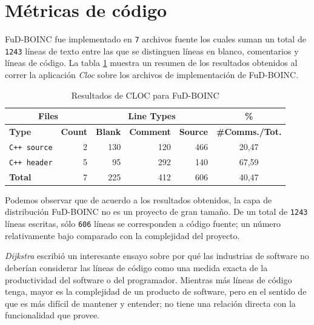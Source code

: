 \newpage
\section{Métricas de código}

FuD-BOINC fue implementado en \texttt{7} archivos fuente los cuales suman un total de \texttt{1243} líneas de texto entre las que se distinguen líneas en blanco, comentarios y líneas de código. La tabla \ref{metrics:cloc} muestra un resumen de los resultados obtenidos al correr la aplicación \textit{Cloc} sobre los archivos de implementación de FuD-BOINC.

\begin{table}[!htf]
    \begin{center}
    \begin{tabular}{|l|r|r|r|r|c|}
    \hline
    \multicolumn{2}{|c|}{Files} & \multicolumn{3}{|c|}{Line Types} & \hspace{0.2cm}\% \\
    \hline
    \textbf{Type} & \textbf{Count} & \textbf{Blank} & \textbf{Comment} & \textbf{Source} & \small{\textbf{\#Comms./Tot.}}\\
    \hline
    \texttt{C++ source} & 2 &  130  &  120  &   466  &   20,47\\
    \hline
    \texttt{C++ header} & 5 &   95  &  292  &   140  &   67,59 \\
    \hline
    \textbf{Total} &    7   &  225  &  412  &   606  &   40,47 \\
    \hline
    \end{tabular}
    \caption{Resultados de CLOC para FuD-BOINC}
    \label{metrics:cloc}
    \end{center}
\end{table}

Podemos observar que de acuerdo a los resultados obtenidos, la capa de distribución FuD-BOINC no es un proyecto de gran tamaño. De un total de \texttt{1243} líneas escritas, sólo \texttt{606} líneas se corresponden a código fuente; un número relativamente bajo comparado con la complejidad del proyecto.

\textit{Dijkstra} escribió un interesante ensayo sobre por qué las industrias de software no deberían considerar las líneas de código como una medida exacta de la productividad del software o del programador. Mientras más líneas de código tenga, mayor es la complejidad de un producto de software, pero en el sentido de que es más difícil de mantener y entender; no tiene una relación directa con la funcionalidad que provee.

